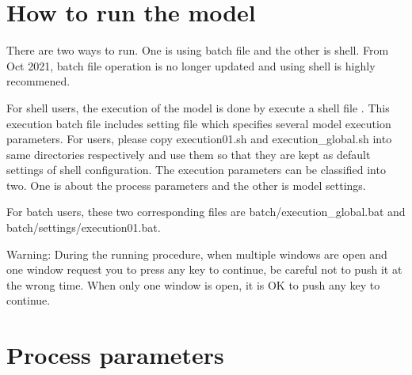 \documentclass[10pt,a4paper,titlepage,dvipdfmx]{book}
\begin{document}
\section{\label{sec:HowtoRunModel}How to run the model}

There are two ways to run. One is using batch file and the other is shell. From Oct 2021, batch file operation is no longer updated and using shell is highly recommened. 

For shell users, the execution of the model is done by execute a shell file . This execution batch file includes setting file  which specifies several model execution parameters. For users, please copy execution01.sh and execution\_global.sh into same directories respectively and use them so that they are kept as default settings of shell configuration. The execution parameters can be classified into two. One is about the process parameters and the other is model settings.

For batch users, these two corresponding files are batch/execution\_global.bat and batch/settings/execution01.bat.

Warning: During the running procedure, when multiple windows are open and one window request you to press any key to continue, be careful not to push it at the wrong time. When only one window is open, it is OK to push any key to continue.

\section{\label{sec:ProPar}Process parameters}
\end{document}
